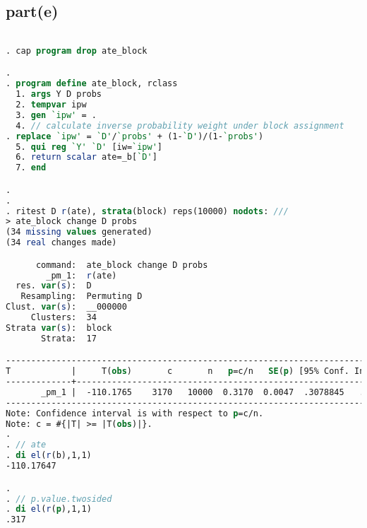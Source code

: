 \documentclass[a4paper]{article}
\begin{document}
\subsection*{part(e)}
\begin{lstlisting}[language=stata]

. cap program drop ate_block

. 
. program define ate_block, rclass
  1. args Y D probs
  2. tempvar ipw
  3. gen `ipw' = .
  4. // calculate inverse probability weight under block assignment
. replace `ipw' = `D'/`probs' + (1-`D')/(1-`probs')
  5. qui reg `Y' `D' [iw=`ipw']
  6. return scalar ate=_b[`D']
  7. end 

. 
. 
. ritest D r(ate), strata(block) reps(10000) nodots: ///
> ate_block change D probs
(34 missing values generated)
(34 real changes made)

      command:  ate_block change D probs
        _pm_1:  r(ate)
  res. var(s):  D
   Resampling:  Permuting D
Clust. var(s):  __000000
     Clusters:  34
Strata var(s):  block
       Strata:  17

------------------------------------------------------------------------------
T            |     T(obs)       c       n   p=c/n   SE(p) [95% Conf. Interval]
-------------+----------------------------------------------------------------
       _pm_1 |  -110.1765    3170   10000  0.3170  0.0047  .3078845   .3262222
------------------------------------------------------------------------------
Note: Confidence interval is with respect to p=c/n.
Note: c = #{|T| >= |T(obs)|}. 
. 
. // ate
. di el(r(b),1,1)
-110.17647

. 
. // p.value.twosided
. di el(r(p),1,1)
.317
\end{lstlisting}
\end{document}
